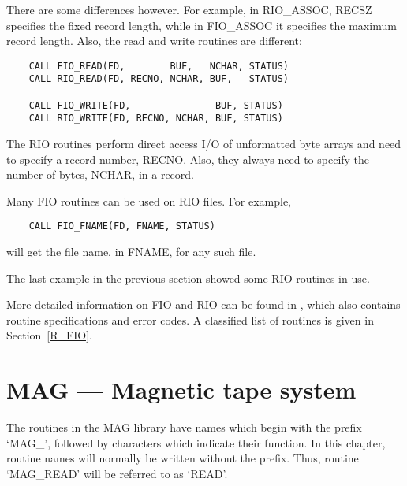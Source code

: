 There are some differences however.
For example, in RIO\_ASSOC, RECSZ specifies the fixed record length, while in
FIO\_ASSOC it specifies the maximum record length.
Also, the read and write routines are different:

\begin{small}
\begin{verbatim}
    CALL FIO_READ(FD,        BUF,   NCHAR, STATUS)
    CALL RIO_READ(FD, RECNO, NCHAR, BUF,   STATUS)

    CALL FIO_WRITE(FD,               BUF, STATUS)
    CALL RIO_WRITE(FD, RECNO, NCHAR, BUF, STATUS)
\end{verbatim}
\end{small}

The RIO routines perform direct access I/O of unformatted byte arrays and need
to specify a record number, RECNO.
Also, they always need to specify the number of bytes, NCHAR, in a record.

Many FIO routines can be used on RIO files.
For example,

\begin{small}
\begin{verbatim}
    CALL FIO_FNAME(FD, FNAME, STATUS)
\end{verbatim}
\end{small}

will get the file name, in FNAME, for any such file.

The last example in the previous section showed some RIO routines in use.

More detailed information on FIO and RIO can be found in
, which also
contains routine specifications and error codes.
A classified list of routines is given in Section~\ref{R_FIO}.

\section{MAG --- Magnetic tape system}
\label{S_mag}


The routines in the MAG library have names which begin with the prefix `MAG\_',
followed by characters which indicate their function.
In this chapter, routine names will normally be written without the prefix.
Thus, routine `MAG\_READ' will be referred to as `READ'.

